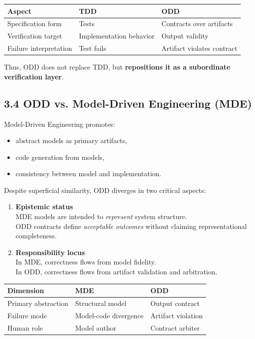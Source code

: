 \documentclass[
]{article}
\begin{document}
\begin{longtable}[]{@{}lll@{}}
\toprule()
Aspect & TDD & ODD \\
\midrule()
\endhead
Specification form & Tests & Contracts over artifacts \\
Verification target & Implementation behavior & Output validity \\
Failure interpretation & Test fails & Artifact violates contract \\
\bottomrule()
\end{longtable}

Thus, ODD does not replace TDD, but \textbf{repositions it as a
subordinate verification layer}.

\hypertarget{34-odd-vs-model-driven-engineering-mde}{%
\subsection{3.4 ODD vs. Model-Driven Engineering
(MDE)}\label{34-odd-vs-model-driven-engineering-mde}}

Model-Driven Engineering promotes:

\begin{itemize}
\item
  abstract models as primary artifacts,
\item
  code generation from models,
\item
  consistency between model and implementation.
\end{itemize}

Despite superficial similarity, ODD diverges in two critical aspects:

\begin{enumerate}
\def\labelenumi{\arabic{enumi}.}
\item
  \textbf{Epistemic status}\\
  MDE models are intended to \emph{represent} system structure.\\
  ODD contracts define \emph{acceptable outcomes} without claiming
  representational completeness.
\item
  \textbf{Responsibility locus}\\
  In MDE, correctness flows from model fidelity.\\
  In ODD, correctness flows from artifact validation and arbitration.
\end{enumerate}

\begin{longtable}[]{@{}lll@{}}
\toprule()
Dimension & MDE & ODD \\
\midrule()
\endhead
Primary abstraction & Structural model & Output contract \\
Failure mode & Model-code divergence & Artifact violation \\
Human role & Model author & Contract arbiter \\
\bottomrule()
\end{longtable}
\end{document}
